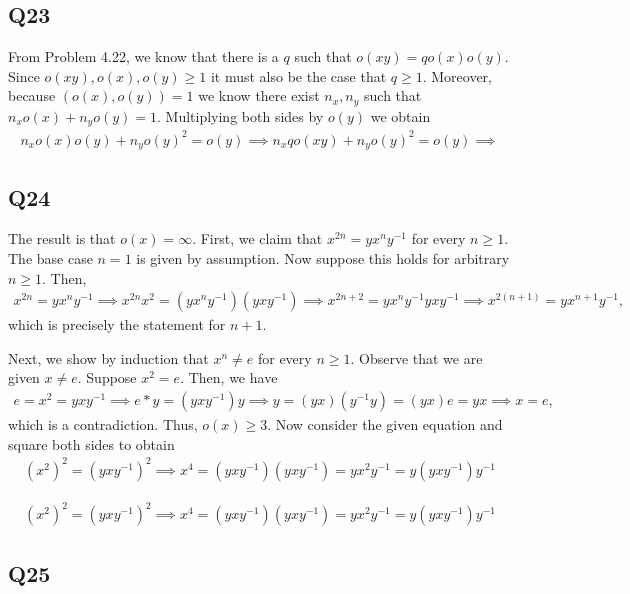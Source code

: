 \documentclass[12pt]{article}
\numberwithin{theorem}{section}
\numberwithin{equation}{section}
\numberwithin{remark}{section}
\numberwithin{definition}{section}
\numberwithin{theorem}{section}
\numberwithin{lemma}{section}
\numberwithin{example}{section}
\begin{document}
\subsection{Q23}

From Problem 4.22, we know that there is a $q$ such that $o(xy)=qo(x)o(y)$. Since $o(xy),o(x),o(y)\ge1$ it must also be the case that $q\ge1$. Moreover, because $(o(x),o(y))=1$ we know there exist $n_x,n_y$ such that $n_xo(x)+n_yo(y)=1$. Multiplying both sides by $o(y)$ we obtain
\begin{align*}
	n_xo(x)o(y)+n_yo(y)^2=o(y) \implies n_xqo(xy)+n_yo(y)^2=o(y) \implies 
\end{align*}



\subsection{Q24}

The result is that $o(x)=\infty$. First, we claim that $x^{2n}=yx^ny^{-1}$ for every $n\ge1$. The base case $n=1$ is given by assumption. Now suppose this holds for arbitrary $n\ge1$. Then,
\begin{align*}
	x^{2n}=yx^ny^{-1}\implies x^{2n}x^2=(yx^ny^{-1})(yxy^{-1}) \implies x^{2n+2}=yx^ny^{-1}yxy^{-1} \implies x^{2(n+1)}=yx^{n+1}y^{-1},
\end{align*}
which is precisely the statement for $n+1$.

Next, we show by induction that $x^n\neq e$ for every $n\ge 1$. Observe that we are given $x\neq e$. Suppose $x^2=e$. Then, we have
\begin{align*}
	e=x^2=yxy^{-1} \implies e*y=(yxy^{-1})y \implies y = (yx)(y^{-1}y) = (yx)e = yx \implies x = e,
\end{align*}
which is a contradiction. Thus, $o(x)\ge3$. Now consider the given equation and square both sides to obtain
\begin{align*}
	(x^2)^2=(yxy^{-1})^2 \implies x^4 = (yxy^{-1})(yxy^{-1}) = yx^2y^{-1}=y(yxy^{-1})y^{-1}
\end{align*}

\begin{align*}
	(x^2)^2=(yxy^{-1})^2 \implies x^4 = (yxy^{-1})(yxy^{-1}) = yx^2y^{-1}=y(yxy^{-1})y^{-1}
\end{align*}



\subsection{Q25}
\end{document}
